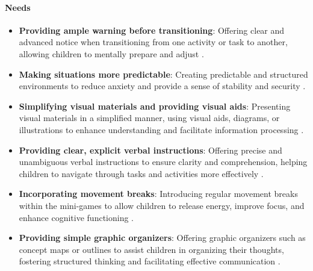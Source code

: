 \paragraph{Needs}
\begin{itemize}
    \item \textbf{Providing ample warning before transitioning}: Offering clear and advanced notice when transitioning from one activity or task to another, allowing children to mentally prepare and adjust \cite{understood_accommodations_2024}.
    \item \textbf{Making situations more predictable}: Creating predictable and structured environments to reduce anxiety and provide a sense of stability and security \cite{understood_accommodations_2024}.
    \item \textbf{Simplifying visual materials and providing visual aids}: Presenting visual materials in a simplified manner, using visual aids, diagrams, or illustrations to enhance understanding and facilitate information processing \cite{understood_accommodations_2024}.
    \item \textbf{Providing clear, explicit verbal instructions}: Offering precise and unambiguous verbal instructions to ensure clarity and comprehension, helping children to navigate through tasks and activities more effectively \cite{understood_accommodations_2024}.
    \item \textbf{Incorporating movement breaks}: Introducing regular movement breaks within the mini-games to allow children to release energy, improve focus, and enhance cognitive functioning \cite{understood_accommodations_2024}.
    \item \textbf{Providing simple graphic organizers}: Offering graphic organizers such as concept maps or outlines to assist children in organizing their thoughts, fostering structured thinking and facilitating effective communication \cite{understood_accommodations_2024}.
\end{itemize}
